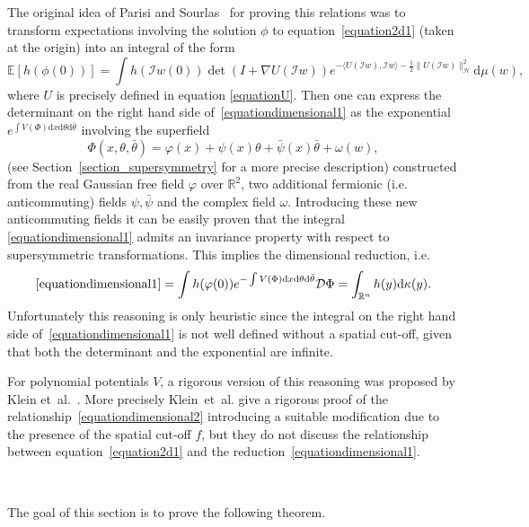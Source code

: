 \documentclass[a4paper,10pt]{article}
\newcommand{\mathd}{\mathrm{d}}
\begin{document}
The original idea of Parisi and Sourlas~{\cite{parisi_random_1979}} for
proving this relations was to transform expectations involving the solution
$\phi$ to equation~{\eqref{equation2d1}} (taken at the origin) into an
integral of the form
\begin{equation}
  \mathbb{E} [h (\phi (0))] = \int h (\mathcal{I}w (0)) \det (I + \nabla U
  (\mathcal{I}w)) e^{- \langle U (\mathcal{I}w), \mathcal{I}w \rangle -
  \frac{1}{2} \| U (\mathcal{I}w) \|^2_{\mathcal{H}}} \mathd \mu (w),
  \label{equationdimensional1}
\end{equation}
where $U$ is precisely defined in equation {\eqref{equationU}}. Then one can
express the determinant on the right hand side
of~{\eqref{equationdimensional1}} as the exponential $e^{\int V (\Phi) \mathd
x \mathd \theta \mathd \bar{\theta}}$ involving the superfield
\[ \Phi (x, \theta, \bar{\theta}) = \varphi (x) + \psi (x) \theta +
   \bar{\psi} (x) \bar{\theta} + \omega (w), \]
(see Section~\ref{section_supersymmetry} for a more precise description)
constructed from the real Gaussian free field $\varphi$ over $\mathbb{R}^2$,
two additional fermionic (i.e. anticommuting) fields $\psi, \bar{\psi}$ and
the complex field $\omega$. Introducing these new anticommuting fields it can
be easily proven that the integral {\eqref{equationdimensional1}} admits an
invariance property with respect to supersymmetric transformations. This
implies the dimensional reduction, i.e.
\begin{equation}
  \eqref{equationdimensional1} = \int h (\varphi (0)) e^{- \int V
  (\Phi) \mathd x \mathd \theta \mathd \bar{\theta}} \mathcal{D} \Phi =
  \int_{\mathbb{R}^n} h (y) \mathd \kappa (y) . \label{equationdimensional2}
\end{equation}
Unfortunately this reasoning is only heuristic since the integral on the right
hand side of~{\eqref{equationdimensional1}} is not well defined without a
spatial cut-off, given that both the determinant and the exponential are
infinite.

For polynomial potentials $V$, a rigorous version of this reasoning was
proposed by Klein et~al.~{\cite{Klein1984}}. More precisely Klein~et~al. give
a rigorous proof of the relationship~{\eqref{equationdimensional2}}
introducing a suitable modification due to the presence of the spatial cut-off
$f$, but they do not discuss the relationship between
equation~{\eqref{equation2d1}} and the
reduction~{\eqref{equationdimensional1}}.

\

The goal of this section is to prove the following theorem.
\end{document}

